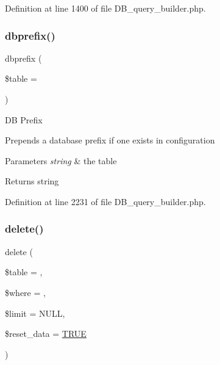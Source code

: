 Definition at line 1400 of file D\+B\+\_\+query\+\_\+builder.\+php.

\mbox{\label{class_c_i___d_b__query__builder_a98b692562f4990d04d161d0408061ed8}} 
\subsubsection{\texorpdfstring{dbprefix()}{dbprefix()}}
{\footnotesize\ttfamily dbprefix (\begin{DoxyParamCaption}\item[{}]{\$table = {\ttfamily \textquotesingle{}\textquotesingle{}} }\end{DoxyParamCaption})}

DB Prefix

Prepends a database prefix if one exists in configuration


\begin{DoxyParams}{Parameters}
{\em string} & the table \\
\hline
\end{DoxyParams}
\begin{DoxyReturn}{Returns}
string 
\end{DoxyReturn}


Definition at line 2231 of file D\+B\+\_\+query\+\_\+builder.\+php.

\mbox{\label{class_c_i___d_b__query__builder_a482722b9989c53ed8ecd68b22df64507}} 
\subsubsection{\texorpdfstring{delete()}{delete()}}
{\footnotesize\ttfamily delete (\begin{DoxyParamCaption}\item[{}]{\$table = {\ttfamily \textquotesingle{}\textquotesingle{}},  }\item[{}]{\$where = {\ttfamily \textquotesingle{}\textquotesingle{}},  }\item[{}]{\$limit = {\ttfamily NULL},  }\item[{}]{\$reset\+\_\+data = {\ttfamily \mbox{\hyperlink{constants_8php_ae04a3efe6aa42044f803ee90c2277846}{T\+R\+UE}}} }\end{DoxyParamCaption})}

